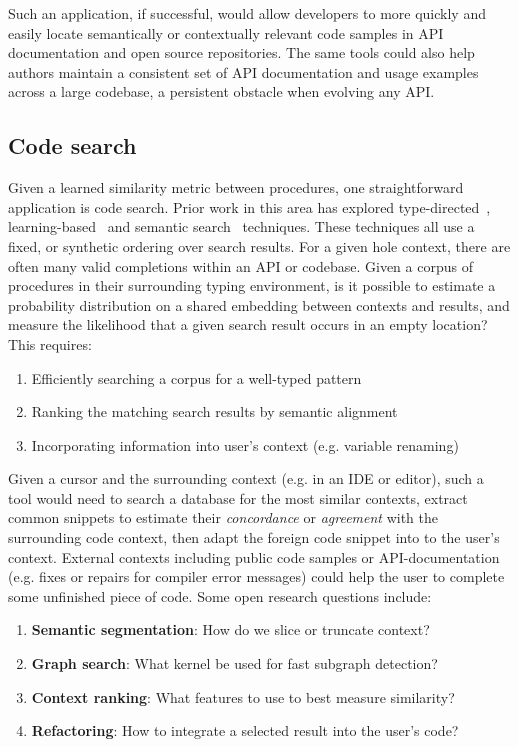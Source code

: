 \documentclass[11pt]{article}
\begin{document}
    Such an application, if successful, would allow developers to more quickly and easily locate semantically or contextually relevant code samples in API documentation and open source repositories. The same tools could also help authors maintain a consistent set of API documentation and usage examples across a large codebase, a persistent obstacle when evolving any API.

    \pagebreak\subsection{Code search}\label{subsec:code-search}

    Given a learned similarity metric between procedures, one straightforward application is code search. Prior work in this area has explored type-directed~\cite{james2020digging}, learning-based~\cite{gu2018deep} and semantic search~\cite{premtoon2020semantic} techniques. These techniques all use a fixed, or synthetic ordering over search results. For a given hole context, there are often many valid completions within an API or codebase. Given a corpus of procedures in their surrounding typing environment, is it possible to estimate a probability distribution on a shared embedding between contexts and results, and measure the likelihood that a given search result occurs in an empty location? This requires:

    \begin{enumerate}
        \item Efficiently searching a corpus for a well-typed pattern
        \item Ranking the matching search results by semantic alignment
        \item Incorporating information into user's context (e.g. variable renaming)
    \end{enumerate}

    Given a cursor and the surrounding context (e.g. in an IDE or editor), such a tool would need to search a database for the most similar contexts, extract common snippets to estimate their \textit{concordance} or \textit{agreement} with the surrounding code context, then adapt the foreign code snippet into to the user's context. External contexts including public code samples or API-documentation (e.g. fixes or repairs for compiler error messages) could help the user to complete some unfinished piece of code. Some open research questions include:

    \begin{enumerate}
        \item \textbf{Semantic segmentation}: How do we slice or truncate context?
        \item \textbf{Graph search}: What kernel be used for fast subgraph detection?
        \item \textbf{Context ranking}: What features to use to best measure similarity?
        \item \textbf{Refactoring}: How to integrate a selected result into the user's code?
    \end{enumerate}
\end{document}

